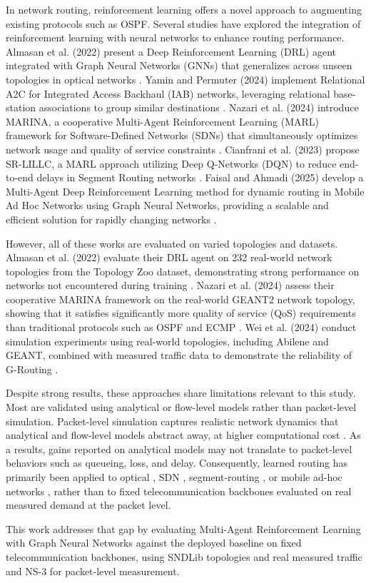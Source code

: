 In network routing, reinforcement learning offers a novel approach to augmenting existing protocols such as OSPF. Several studies have explored the integration of reinforcement learning with neural networks to enhance routing performance. Almasan et al. (2022) present a Deep Reinforcement Learning (DRL) agent integrated with Graph Neural Networks (GNNs) that generalizes across unseen topologies in optical networks \cite{ALMASAN2022184}. Yamin and Permuter (2024) implement Relational A2C for Integrated Access Backhaul (IAB) networks, leveraging relational base-station associations to group similar destinations \cite{Yamin2024}. Nazari et al. (2024) introduce MARINA, a cooperative Multi-Agent Reinforcement Learning (MARL) framework for Software-Defined Networks (SDNs) that simultaneously optimizes network usage and quality of service constraints \cite{11364348}. Cianfrani et al. (2023) propose SR-LILLC, a MARL approach utilizing Deep Q-Networks (DQN) to reduce end-to-end delays in Segment Routing networks \cite{10225785}. Faisal and Ahmadi (2025) develop a Multi-Agent Deep Reinforcement Learning method for dynamic routing in Mobile Ad Hoc Networks using Graph Neural Networks, providing a scalable and efficient solution for rapidly changing networks \cite{11134361}.

However, all of these works are evaluated on varied topologies and datasets. Almasan et al. (2022) evaluate their DRL agent on 232 real-world network topologies from the Topology Zoo dataset, demonstrating strong performance on networks not encountered during training \cite{ALMASAN2022184}. Nazari et al. (2024) assess their cooperative MARINA framework on the real-world GEANT2 network topology, showing that it satisfies significantly more quality of service (QoS) requirements than traditional protocols such as OSPF and ECMP \cite{11364348}. Wei et al. (2024) conduct simulation experiments using real-world topologies, including Abilene and GEANT, combined with measured traffic data to demonstrate the reliability of G-Routing \cite{10293208}.


Despite strong results, these approaches share limitations relevant to this study. Most are validated using analytical or flow-level models rather than packet-level simulation. Packet-level simulation captures realistic network dynamics that analytical and flow-level models abstract away, at higher computational cost \cite{1443314}. As a results, gains reported on analytical models may not translate to packet-level behaviors such as queueing, loss, and delay. Consequently, learned routing has primarily been applied to optical \cite{ALMASAN2022184}, SDN \cite{11364348}, segment-routing \cite{10225785}, or mobile ad-hoc networks \cite{11134361}, rather than to fixed telecommunication backbones evaluated on real measured demand at the packet level.

This work addresses that gap by evaluating Multi-Agent Reinforcement Learning with Graph Neural Networks against the deployed baseline on fixed telecommunication backbones, using SNDLib topologies and real measured traffic \cite{SNDlib10, OrlowskiPioroTomaszewskiWessaely2010} and NS-3 \cite{Riley2010} for packet-level measurement.